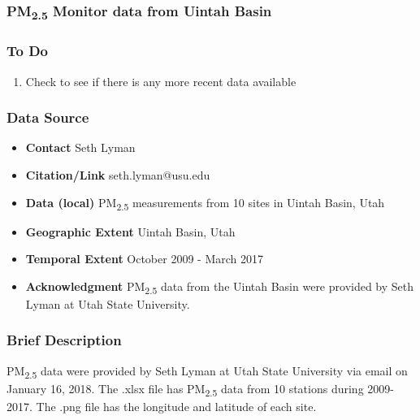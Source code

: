\subsubsection{\texorpdfstring{PM\textsubscript{2.5}}{} Monitor data from Uintah Basin}

\subsubsection*{To Do}
\begin{enumerate}
\item Check to see if there is any more recent data available
\end{enumerate}

\subsubsection*{Data Source}

\begin{itemize}[nolistsep]
\item \textbf{Contact} Seth Lyman 
\item \textbf{Citation/Link} seth.lyman@usu.edu
\item \textbf{Data (local)} PM\textsubscript{2.5} measurements from 10 sites in Uintah Basin, Utah
\item \textbf{Geographic Extent} Uintah Basin, Utah
\item \textbf{Temporal Extent} October 2009 - March 2017
\item \textbf{Acknowledgment} PM\textsubscript{2.5} data from the Uintah Basin were provided by Seth Lyman at Utah State University.
\end{itemize}

\subsubsection*{Brief Description}

PM\textsubscript{2.5} data were provided by Seth Lyman at Utah State University via email on January 16, 2018. The .xlsx file has PM\textsubscript{2.5} data from 10 stations during 2009-2017. The .png file has the longitude and latitude of each site. 

